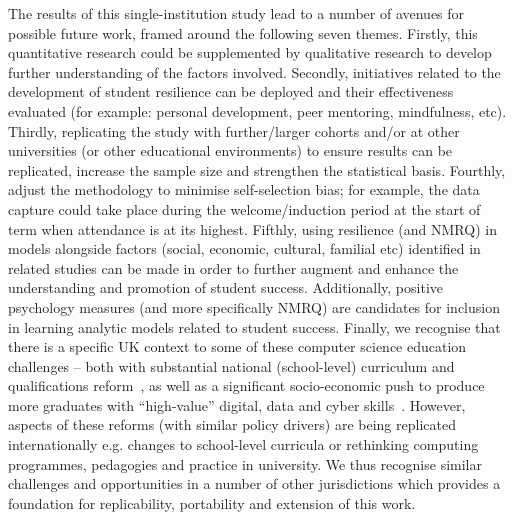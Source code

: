 \documentclass[sigconf]{acmart}
\begin{document}
The results of this single-institution study lead to a number of avenues for possible future work, framed around the following seven themes. Firstly, this quantitative research could be supplemented by qualitative research to develop further understanding of the factors involved. Secondly, initiatives related to the development of student resilience can be deployed and their effectiveness evaluated (for example: personal development, peer mentoring, mindfulness, etc). Thirdly, replicating the study with further/larger cohorts and/or at other universities (or other educational environments) to ensure results can be replicated, increase the sample size and strengthen the statistical basis. Fourthly, adjust the methodology to minimise self-selection bias; for example, the data capture could take place during the welcome/induction period at the start of term when attendance is at its highest. Fifthly, using resilience (and NMRQ) in models alongside factors (social, economic, cultural, familial etc) identified in related studies can be made in order to further augment and enhance the understanding and promotion of student success. Additionally, positive psychology measures (and more specifically NMRQ) are candidates for inclusion in learning analytic models related to student success. Finally, we recognise that there is a specific UK context to some of these computer science education challenges -- both with substantial national (school-level) curriculum and qualifications reform~\cite{brown-et-al-toce2014}, as well as a significant socio-economic push to produce more graduates with ``high-value'' digital, data and cyber skills~\cite{crick-et-al:fie2019,crick-et-al-accred:cep2020}. However, aspects of these reforms (with similar policy drivers) are being replicated internationally e.g. changes to school-level curricula or rethinking computing programmes, pedagogies and practice in university. We thus recognise similar challenges and opportunities in a number of other jurisdictions which provides a foundation for replicability, portability and extension of this work.




\appendix
\end{document}
